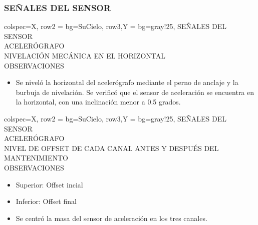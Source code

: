 \subsubsection{SEÑALES DEL SENSOR}
\begin{tblr}{
        colspec={X},
        row{2} = {bg=SuCielo},
        row{3,Y} = {bg=gray!25},
    } %
    SEÑALES DEL SENSOR \\
    ACELERÓGRAFO \MakeUppercase{} \\
    NIVELACIÓN MECÁNICA EN EL HORIZONTAL \\
    OBSERVACIONES \\
    \begin{itemize}
        \item Se niveló la horizontal del acelerógrafo mediante el perno de anclaje y la burbuja de nivelación. Se verificó que el sensor de aceleración se encuentra en la horizontal, con una inclinación menor a 0.5 grados.
    \end{itemize}
\end{tblr}
% 
\newpage
\begin{tblr}{
        colspec={X},
        row{2} = {bg=SuCielo},
        row{3,Y} = {bg=gray!25},
    } %
    SEÑALES DEL SENSOR \\
    ACELERÓGRAFO \MakeUppercase{} \\
    NIVEL DE OFFSET DE CADA CANAL ANTES Y DESPUÉS DEL MANTENIMIENTO \\
    OBSERVACIONES \\
    \begin{itemize}
        \item Superior: Offset incial
        \item Inferior: Offset final
        \item Se centró la masa del sensor de aceleración en los tres canales.
    \end{itemize}
\end{tblr}
